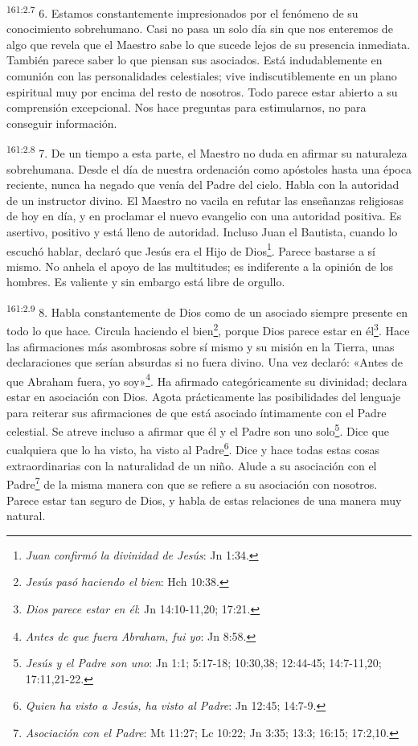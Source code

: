 \par 
\textsuperscript{161:2.7} 6. Estamos constantemente impresionados por el fenómeno de su conocimiento sobrehumano. Casi no pasa un solo día sin que nos enteremos de algo que revela que el Maestro sabe lo que sucede lejos de su presencia inmediata. También parece saber lo que piensan sus asociados. Está indudablemente en comunión con las personalidades celestiales; vive indiscutiblemente en un plano espiritual muy por encima del resto de nosotros. Todo parece estar abierto a su comprensión excepcional. Nos hace preguntas para estimularnos, no para conseguir información.

\par 
\textsuperscript{161:2.8} 7. De un tiempo a esta parte, el Maestro no duda en afirmar su naturaleza sobrehumana. Desde el día de nuestra ordenación como apóstoles hasta una época reciente, nunca ha negado que venía del Padre del cielo. Habla con la autoridad de un instructor divino. El Maestro no vacila en refutar las enseñanzas religiosas de hoy en día, y en proclamar el nuevo evangelio con una autoridad positiva. Es asertivo, positivo y está lleno de autoridad. Incluso Juan el Bautista, cuando lo escuchó hablar, declaró que Jesús era el Hijo de Dios\footnote{\textit{Juan confirmó la divinidad de Jesús}: Jn 1:34.}. Parece bastarse a sí mismo. No anhela el apoyo de las multitudes; es indiferente a la opinión de los hombres. Es valiente y sin embargo está libre de orgullo.

\par 
\textsuperscript{161:2.9} 8. Habla constantemente de Dios como de un asociado siempre presente en todo lo que hace. Circula haciendo el bien\footnote{\textit{Jesús pasó haciendo el bien}: Hch 10:38.}, porque Dios parece estar en él\footnote{\textit{Dios parece estar en él}: Jn 14:10-11,20; 17:21.}. Hace las afirmaciones más asombrosas sobre sí mismo y su misión en la Tierra, unas declaraciones que serían absurdas si no fuera divino. Una vez declaró: «Antes de que Abraham fuera, yo soy»\footnote{\textit{Antes de que fuera Abraham, fui yo}: Jn 8:58.}. Ha afirmado categóricamente su divinidad; declara estar en asociación con Dios. Agota prácticamente las posibilidades del lenguaje para reiterar sus afirmaciones de que está asociado íntimamente con el Padre celestial. Se atreve incluso a afirmar que él y el Padre son uno solo\footnote{\textit{Jesús y el Padre son uno}: Jn 1:1; 5:17-18; 10:30,38; 12:44-45; 14:7-11,20; 17:11,21-22.}. Dice que cualquiera que lo ha visto, ha visto al Padre\footnote{\textit{Quien ha visto a Jesús, ha visto al Padre}: Jn 12:45; 14:7-9.}. Dice y hace todas estas cosas extraordinarias con la naturalidad de un niño. Alude a su asociación con el Padre\footnote{\textit{Asociación con el Padre}: Mt 11:27; Lc 10:22; Jn 3:35; 13:3; 16:15; 17:2,10.} de la misma manera con que se refiere a su asociación con nosotros. Parece estar tan seguro de Dios, y habla de estas relaciones de una manera muy natural.

